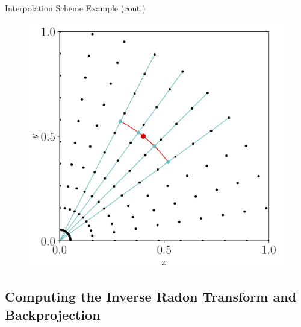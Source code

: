 \documentclass{beamer}
\newcommand{\bunderline}[1]{\underline{#1}}
\renewcommand{\vec}[1]{{\bunderline{#1}}}
\begin{document}
\begin{frame}{Interpolation Scheme Example (cont.)}
	\begin{figure}[H]
		\centering
		\includegraphics[scale=0.5]{figures/Interp4.png}
	\end{figure}
\end{frame}

\subsection{Computing the Inverse Radon Transform and Backprojection}

\end{document}
